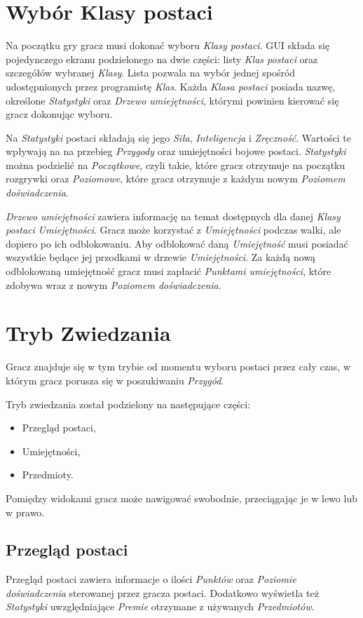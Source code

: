 \documentclass[openright]{xmgr}
\begin{document}
\section{Wybór Klasy postaci}

Na początku gry gracz musi dokonać wyboru \textit{Klasy postaci}. GUI składa się pojedynczego ekranu podzielonego na dwie części: listy \textit{Klas postaci} oraz szczegółów wybranej \textit{Klasy}. Lista pozwala na wybór jednej spośród udostępnionych przez programistę \textit{Klas}. Każda \textit{Klasa postaci} posiada nazwę, określone \textit{Statystyki} oraz \textit{Drzewo umiejętności}, którymi powinien kierować się gracz dokonując wyboru.

Na \textit{Statystyki} postaci składają się  jego \textit{Siła}, \textit{Inteligencja} i \textit{Zręczność}. Wartości te wpływają na na przebieg \textit{Przygody} oraz umiejętności bojowe postaci. \textit{Statystyki} można podzielić na \textit{Początkowe}, czyli takie, które gracz otrzymuje na początku rozgrywki oraz \textit{Poziomowe}, które gracz otrzymuje z każdym nowym \textit{Poziomem doświadczenia}.

\textit{Drzewo umiejętności} zawiera informację na temat dostępnych dla danej \textit{Klasy postaci} \textit{Umiejętności}. Gracz może korzystać z \textit{Umiejętności} podczas walki, ale dopiero po ich odblokowaniu. Aby odblokować daną \textit{Umiejętność} musi posiadać wszystkie będące jej przodkami w drzewie \textit{Umiejętności}. Za każdą nową odblokowaną umiejętność gracz musi zapłacić \textit{Punktami umiejętności}, które zdobywa wraz z nowym \textit{Poziomem doświadczenia}.

\section{Tryb Zwiedzania}

Gracz znajduje się w tym trybie od momentu wyboru postaci przez cały czas, w którym gracz porusza się w poszukiwaniu \textit{Przygód}. 

Tryb zwiedzania został podzielony na następujące części: 
\begin{itemize}
	\item Przegląd postaci,
	\item Umiejętności,
	\item Przedmioty.
\end{itemize}
Pomiędzy widokami gracz może nawigować swobodnie, przeciągając je w lewo lub w prawo.
\subsection*{Przegląd postaci}
Przegląd postaci zawiera informacje o ilości \textit{Punktów} oraz \textit{Poziomie doświadczenia} sterowanej przez gracza postaci. Dodatkowo wyświetla też \textit{Statystyki} uwzględniające \textit{Premie} otrzymane z używanych \textit{Przedmiotów}.
\end{document}
